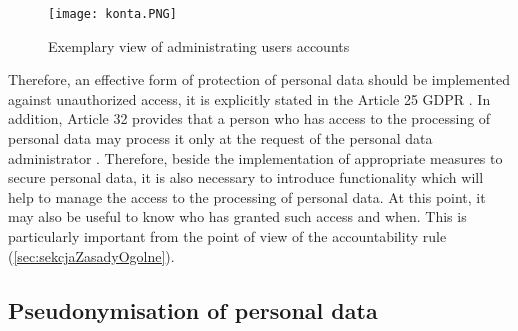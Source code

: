 \documentclass[en, noamssymb]{mgr}
\begin{document}
\begin{figure}[]
	\centering
	\texttt{[image: konta.PNG]}
	\caption[Exemplary view of administrating users accounts]{Exemplary view of administrating users accounts}
	\label{fig:accountsAdministration}
\end{figure}

Therefore, an effective form of protection of personal data should be implemented against unauthorized access, it is explicitly stated in the Article 25 GDPR \cite{rodo_art25}. In addition, Article 32 provides that a person who has access to the processing of personal data may process it only at the request of the personal data administrator \cite{rodo_art32}. Therefore, beside the implementation of appropriate measures to secure personal data, it is also necessary to introduce functionality which will help to manage the access to the processing of personal data. At this point, it may also be useful to know who has granted such access and when. This is particularly important from the point of view of the accountability rule (\ref{sec:sekcjaZasadyOgolne}). 




\subsection{Pseudonymisation of personal data}
\end{document}
